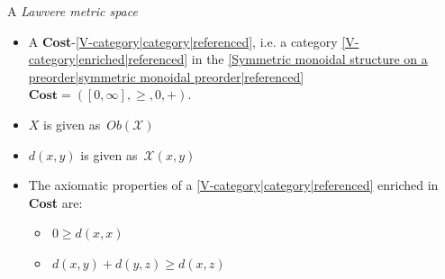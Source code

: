 
A \emph{Lawvere metric space}

\begin{itemize}
    \item  A \textbf{Cost}-\ref{V-category|category|referenced}, i.e. a category \ref{V-category|enriched|referenced} in the \ref{Symmetric monoidal structure on a preorder|symmetric monoidal preorder|referenced} $\mathbf{Cost}=([0,\infty],\geq,0,+)$.
    \item $X$ is given as \,$Ob(\mathcal{X})$\,
    \item $d(x,y)$ is given as \,$\mathcal{X}(x,y)$\,
    \item The axiomatic properties of a \ref{V-category|category|referenced} enriched in \textbf{Cost} are:
          \begin{itemize}
            \item \,$0 \geq d(x,x)$\,
            \item \,$d(x,y)+d(y,z) \geq d(x,z)$\,
          \end{itemize}
  \end{itemize}
